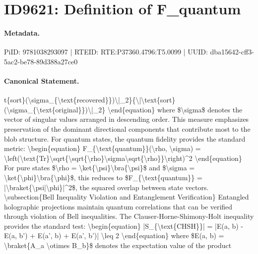 \section*{ID9621: Definition of F\_quantum}
\paragraph{Metadata.}
PiID: 9781038293097 | RTEID: RTE:P37360.4796:T5.0099 | UUID: dba15642-cff3-5ac2-be78-89d388a27ce0

\paragraph{Canonical Statement.}
t\{sort\}(\textbackslash{}sigma\_\{\textbackslash{}text\{recovered\}\})\textbackslash{}|\_2\}\{\textbackslash{}|\textbackslash{}text\{sort\}(\textbackslash{}sigma\_\{\textbackslash{}text\{original\}\})\textbackslash{}|\_2\} \textbackslash{}end\{equation\} where \$\textbackslash{}sigma\$ denotes the vector of singular values arranged in descending order. This measure emphasizes preservation of the dominant directional components that contribute most to the blob structure. For quantum states, the quantum fidelity provides the standard metric: \textbackslash{}begin\{equation\} F\_\{\textbackslash{}text\{quantum\}\}(\textbackslash{}rho, \textbackslash{}sigma) = \textbackslash{}left(\textbackslash{}text\{Tr\}\textbackslash{}sqrt\{\textbackslash{}sqrt\{\textbackslash{}rho\}\textbackslash{}sigma\textbackslash{}sqrt\{\textbackslash{}rho\}\}\textbackslash{}right)\textasciicircum{}2 \textbackslash{}end\{equation\} For pure states \$\textbackslash{}rho = \textbackslash{}ket\{\textbackslash{}psi\}\textbackslash{}bra\{\textbackslash{}psi\}\$ and \$\textbackslash{}sigma = \textbackslash{}ket\{\textbackslash{}phi\}\textbackslash{}bra\{\textbackslash{}phi\}\$, this reduces to \$F\_\{\textbackslash{}text\{quantum\}\} = |\textbackslash{}braket\{\textbackslash{}psi|\textbackslash{}phi\}|\textasciicircum{}2\$, the squared overlap between state vectors. \textbackslash{}subsection\{Bell Inequality Violation and Entanglement Verification\} Entangled holographic projections maintain quantum correlations that can be verified through violation of Bell inequalities. The Clauser-Horne-Shimony-Holt inequality provides the standard test: \textbackslash{}begin\{equation\} |S\_\{\textbackslash{}text\{CHSH\}\}| = |E(a, b) - E(a, b') + E(a', b) + E(a', b')| \textbackslash{}leq 2 \textbackslash{}end\{equation\} where \$E(a, b) = \textbackslash{}braket\{A\_a \textbackslash{}otimes B\_b\}\$ denotes the expectation value of the product

